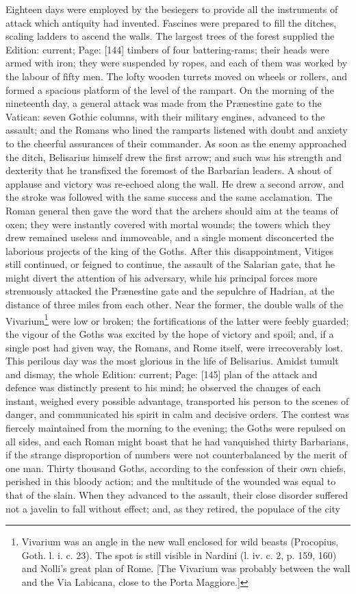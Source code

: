 Eighteen days were employed by the besiegers to provide all the instruments of attack which antiquity had invented. Fascines were prepared to fill the ditches, scaling ladders to ascend the walls. The largest trees of the forest supplied the Edition: current; Page: [144] timbers of four battering-rams; their heads were armed with iron; they were suspended by ropes, and each of them was worked by the labour of fifty men. The lofty wooden turrets moved on wheels or rollers, and formed a spacious platform of the level of the rampart. On the morning of the nineteenth day, a general attack was made from the Prænestine gate to the Vatican: seven Gothic columns, with their military engines, advanced to the assault; and the Romans who lined the ramparts listened with doubt and anxiety to the cheerful assurances of their commander. As soon as the enemy approached the ditch, Belisarius himself drew the first arrow; and such was his strength and dexterity that he transfixed the foremost of the Barbarian leaders. A shout of applause and victory was re-echoed along the wall. He drew a second arrow, and the stroke was followed with the same success and the same acclamation. The Roman general then gave the word that the archers should aim at the teams of oxen; they were instantly covered with mortal wounds; the towers which they drew remained useless and immoveable, and a single moment disconcerted the laborious projects of the king of the Goths. After this disappointment, Vitiges still continued, or feigned to continue, the assault of the Salarian gate, that he might divert the attention of his adversary, while his principal forces more strenuously attacked the Prænestine gate and the sepulchre of Hadrian, at the distance of three miles from each other. Near the former, the double walls of the Vivarium\footnote{Vivarium was an angle in the new wall enclosed for wild beasts (Procopius, Goth. l. i. c. 23). The spot is still visible in Nardini (l. iv. c. 2, p. 159, 160) and Nolli\texthebrew{}’s great plan of Rome. [The Vivarium was probably between the wall and the Via Labicana, close to the Porta Maggiore.]} were low or broken; the fortifications of the latter were feebly guarded; the vigour of the Goths was excited by the hope of victory and spoil; and, if a single post had given way, the Romans, and Rome itself, were irrecoverably lost. This perilous day was the most glorious in the life of Belisarius. Amidst tumult and dismay, the whole Edition: current; Page: [145] plan of the attack and defence was distinctly present to his mind; he observed the changes of each instant, weighed every possible advantage, transported his person to the scenes of danger, and communicated his spirit in calm and decisive orders. The contest was fiercely maintained from the morning to the evening; the Goths were repulsed on all sides, and each Roman might boast that he had vanquished thirty Barbarians, if the strange disproportion of numbers were not counterbalanced by the merit of one man. Thirty thousand Goths, according to the confession of their own chiefs, perished in this bloody action; and the multitude of the wounded was equal to that of the slain. When they advanced to the assault, their close disorder suffered not a javelin to fall without effect; and, as they retired, the populace of the city 
